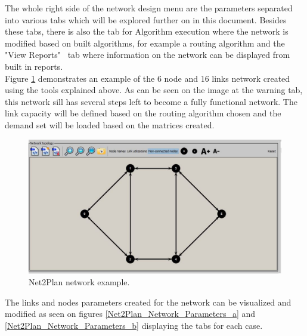 	The whole right side of the network design menu are the parameters separated into various tabs which will be explored further on in this document. Besides these tabs, there is also the tab for Algorithm execution where the network is modified based on built algorithms, for example a routing algorithm and the "View Reports" \ tab where information on the network can be displayed from built in reports. \\

	Figure \ref{Net2Plan_Network_1} demonstrates an example of the 6 node and 16 links network created using the tools explained above. As can be seen on the image at the warning tab, this network sill has several steps left to become a fully functional network. The link capacity will be defined based on the routing algorithm chosen and the demand set will be loaded based on the matrices created. \\
		
	\begin{figure}[h!]
		\centering
		\includegraphics[width = 12cm]{Net2Plan_Network_1.pdf}
		\caption{Net2Plan network example.}
		\label{Net2Plan_Network_1}
	\end{figure}

	The links and nodes parameters created for the network can be visualized and modified as seen on figures \ref{Net2Plan_Network_Parameters_a} and \ref{Net2Plan_Network_Parameters_b} displaying the tabs for each case.
	

